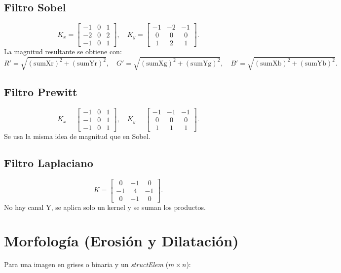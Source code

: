 \documentclass[11pt]{article}
\begin{document}
\subsection{Filtro Sobel}
\[
K_x = 
\begin{bmatrix}
-1 & 0 & 1\\
-2 & 0 & 2\\
-1 & 0 & 1
\end{bmatrix},
\quad
K_y =
\begin{bmatrix}
-1 & -2 & -1\\
\;\,0 & \;\,0 & \;\,0\\
\;\,1 & \;\,2 & \;\,1
\end{bmatrix}.
\]
La magnitud resultante se obtiene con:
\[
R' = \sqrt{( \text{sumXr} )^2 + ( \text{sumYr} )^2},
\quad
G' = \sqrt{( \text{sumXg} )^2 + ( \text{sumYg} )^2},
\quad
B' = \sqrt{( \text{sumXb} )^2 + ( \text{sumYb} )^2}.
\]

\subsection{Filtro Prewitt}
\[
K_x = 
\begin{bmatrix}
-1 & 0 & 1\\
-1 & 0 & 1\\
-1 & 0 & 1
\end{bmatrix},
\quad
K_y =
\begin{bmatrix}
-1 & -1 & -1\\
\;\,0 & \;\,0 & \;\,0\\
\;\,1 & \;\,1 & \;\,1
\end{bmatrix}.
\]
Se usa la misma idea de magnitud que en Sobel.

\subsection{Filtro Laplaciano}
\[
K =
\begin{bmatrix}
\;\,0 & -1 & \;\,0\\
-1 & \;\,4 & -1\\
\;\,0 & -1 & \;\,0
\end{bmatrix}.
\]
No hay canal Y, se aplica solo un kernel y se suman los productos.

\section{Morfología (Erosión y Dilatación)}

Para una imagen en grises o binaria y un \textit{structElem} (\(m \times n\)):
\end{document}
